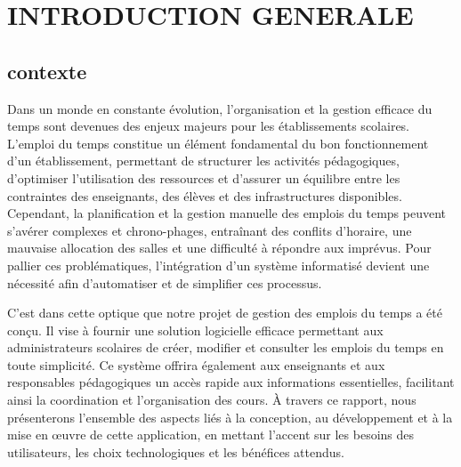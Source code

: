 \documentclass[english,12pt,a4paper]{report}
\begin{document}


\chapter*{INTRODUCTION GENERALE}
\vspace{0.8cm}

\section{contexte}
Dans un monde en constante évolution, l'organisation et la gestion efficace du temps sont devenues des enjeux majeurs pour les établissements scolaires. L'emploi du temps constitue un élément fondamental du bon fonctionnement d'un établissement, permettant de structurer les activités pédagogiques, d'optimiser l'utilisation des ressources et d'assurer un équilibre entre les contraintes des enseignants, des élèves et des infrastructures disponibles. Cependant, la planification et la gestion manuelle des emplois du temps peuvent s'avérer complexes et chrono-phages, entraînant des conflits d'horaire, une mauvaise allocation des salles et une difficulté à répondre aux imprévus. Pour pallier ces problématiques, l'intégration d'un système informatisé devient une nécessité afin d'automatiser et de simplifier ces processus.

C’est dans cette optique que notre projet de gestion des emplois du temps a été conçu. Il vise à fournir une solution logicielle efficace permettant aux administrateurs scolaires de créer, modifier et consulter les emplois du temps en toute simplicité. Ce système offrira également aux enseignants et aux responsables pédagogiques un accès rapide aux informations essentielles, facilitant ainsi la coordination et l’organisation des cours. À travers ce rapport, nous présenterons l’ensemble des aspects liés à la conception, au développement et à la mise en œuvre de cette application, en mettant l’accent sur les besoins des utilisateurs, les choix technologiques et les bénéfices attendus.
\end{document}
